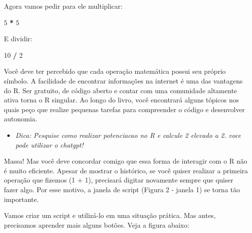 \documentclass[
]{book}
\newenvironment{Shaded}{\begin{snugshade}}{\end{snugshade}}
\newcommand{\DecValTok}[1]{\textcolor[rgb]{0.00,0.00,0.81}{#1}}
\newcommand{\SpecialCharTok}[1]{\textcolor[rgb]{0.81,0.36,0.00}{\textbf{#1}}}
\providecommand{\tightlist}{%
  \setlength{\itemsep}{0pt}\setlength{\parskip}{0pt}}
\begin{document}
Agora vamos pedir para ele multiplicar:

\begin{Shaded}
\begin{Highlighting}[]
\DecValTok{5} \SpecialCharTok{*} \DecValTok{5}
\end{Highlighting}
\end{Shaded}

E dividir:

\begin{Shaded}
\begin{Highlighting}[]
\DecValTok{10} \SpecialCharTok{/} \DecValTok{2}
\end{Highlighting}
\end{Shaded}

Você deve ter percebido que cada operação matemática possui seu próprio símbolo. A facilidade de encontrar informações na internet é uma das vantagens do R. Ser gratuito, de código aberto e contar com uma comunidade altamente ativa torna o R singular. Ao longo do livro, você encontrará alguns tópicos nos quais peço que realize pequenas tarefas para compreender o código e desenvolver autonomia.

\begin{itemize}
\tightlist
\item
  \emph{Dica: Pesquise como realizar potenciacao no R e calcule 2 elevado a 2. voce pode utilizar o chatgpt!}
\end{itemize}

Massa! Mas você deve concordar comigo que essa forma de interagir com o R não é muito eficiente. Apesar de mostrar o histórico, se você quiser realizar a primeira operação que fizemos (1 + 1), precisará digitar novamente sempre que quiser fazer algo. Por esse motivo, a janela de script (Figura 2 - janela 1) se torna tão importante.

Vamos criar um script e utilizá-lo em uma situação prática. Mas antes, precisamos aprender mais alguns botões. Veja a figura abaixo:
\end{document}
